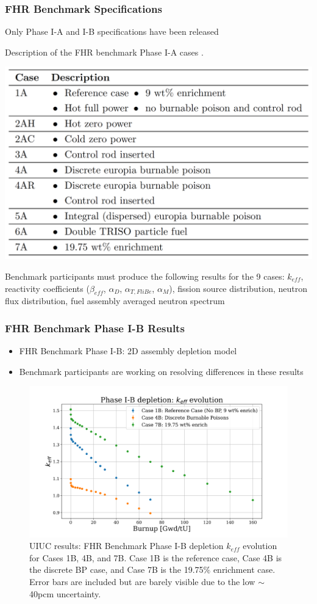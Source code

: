 \begin{frame}
    \frametitle{FHR Benchmark Specifications}
    Only Phase I-A and I-B specifications have been released 
    \begin{table}
        \caption{Description of the \acrlong{FHR} benchmark Phase I-A cases 
        \vspace{-0.25cm}
        \cite{petrovic_benchmark_2021}.}
        \includegraphics[width=0.6\linewidth]{figures/benchmark-cases.png} 
    \end{table}
    Benchmark participants must produce the following results for 
    the 9 cases: $k_{eff}$, reactivity coefficients ($\beta_{eff}$, 
    $\alpha_D$, $\alpha_{T, FliBe}$, $\alpha_M$), fission source distribution, 
    neutron flux distribution, fuel assembly averaged neutron spectrum
\end{frame}

\begin{frame}
    \frametitle{FHR Benchmark Phase I-B Results}
    \begin{itemize}
        \item FHR Benchmark Phase I-B: 2D assembly depletion model
        \item Benchmark participants are working on resolving differences in 
        these results
    \end{itemize}
    \vspace{-0.2cm}
    \begin{figure}[]
        \centering
        \includegraphics[width=0.75\linewidth]{../docs/figures/phase1b_keff.png} 
        \caption{UIUC results: FHR Benchmark Phase I-B depletion 
        $k_{eff}$ evolution for Cases 1B, 4B, and 7B. Case 1B is the reference case, 
        Case 4B is the discrete \acrlong{BP} case, and Case 7B is the 19.75$\%$ 
        enrichment case. Error bars are included but are barely visible due to the 
        low $\sim$40pcm uncertainty.}
    \end{figure}
\end{frame}

